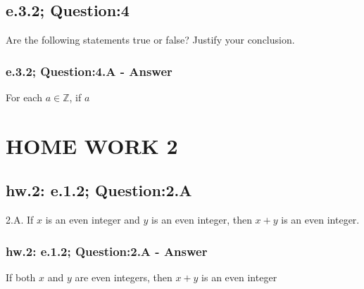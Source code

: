 \newpage
\subsection{e.3.2; Question:4}
Are the following statements true or false? Justify your conclusion.

\subsubsection*{e.3.2; Question:4.A - Answer}
For each $a \in \mathbb{Z}$, if $a$












\newpage
\section{HOME WORK 2}

\subsection{hw.2: e.1.2; Question:2.A}
2.A. If $x$ is an even integer and $y$ is an even integer, then $x + y$ is an even integer. \\ 

\subsubsection*{hw.2: e.1.2; Question:2.A - Answer}

\begin{tcolorbox}
	\begin{theorem}
		If both $x$ and $y$ are even integers, then $x + y$ is an even integer
	\end{theorem}
\end{tcolorbox}

